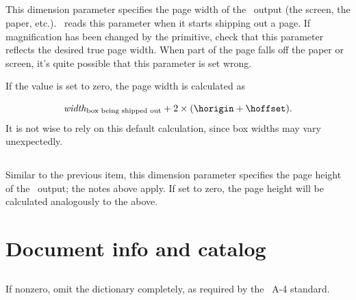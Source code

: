 \documentclass{pdftexmanual}
\begin{document}
\subsection{}

This dimension parameter specifies the page width of the \PDF\ output
(the screen, the paper, etc.). \PDFTEX\ reads this parameter when it
starts shipping out a page. If magnification has been changed by the
 primitive, check that this parameter reflects the desired true
page width. When part of the page falls off the paper or screen, it's
quite possible that this parameter is set wrong.

If the value is set to zero, the page width is calculated as

\[
\hbox{\textit{width}}_{\hbox{\scriptsize box being shipped out}}
+ 2 \times (\mbox{\tt \textbackslash horigin} + \hbox{\mbox{\tt \textbackslash hoffset}}).
\]
It is not wise to rely on this default calculation, since box widths may
vary unexpectedly.

\subsection{}

Similar to the previous item, this dimension parameter specifies the
page height of the \PDF\ output; the notes above apply. If set to zero,
the page height will be calculated analogously to the above.

\section{Document info and catalog}
\label{sec.docinfocatalog}

\subsection{}

If nonzero, omit the  dictionary completely, as required by
the \PDF\ A-4 standard. 

\subsection{}
\end{document}
